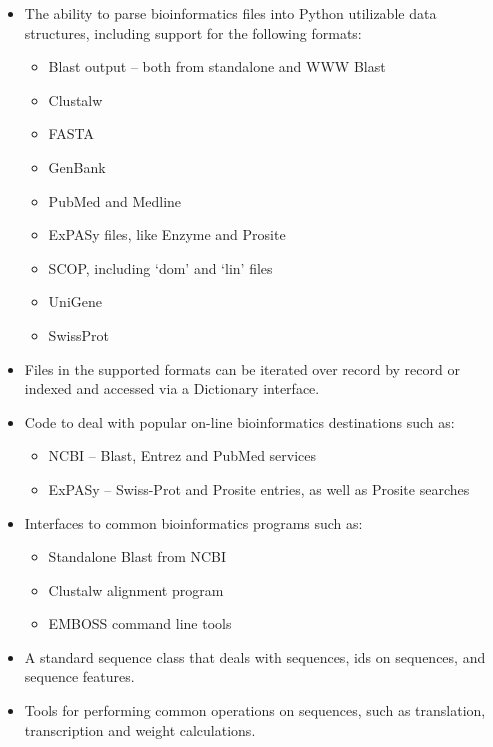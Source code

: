 \begin{itemize}
  \item The ability to parse bioinformatics files into Python utilizable data structures, including support for the following formats:

  \begin{itemize}
    \item Blast output -- both from standalone and WWW Blast
    \item Clustalw
    \item FASTA
    \item GenBank
    \item PubMed and Medline
    \item ExPASy files, like Enzyme and Prosite
    \item SCOP, including `dom' and `lin' files
    \item UniGene
    \item SwissProt
  \end{itemize}

  \item Files in the supported formats can be iterated over record by record or indexed and accessed via a Dictionary interface.

  \item Code to deal with popular on-line bioinformatics destinations such as:

  \begin{itemize}
    \item NCBI -- Blast, Entrez and PubMed services
    \item ExPASy -- Swiss-Prot and Prosite entries, as well as Prosite searches
  \end{itemize}

  \item Interfaces to common bioinformatics programs such as:

  \begin{itemize}
    \item Standalone Blast from NCBI
    \item Clustalw alignment program
    \item EMBOSS command line tools
  \end{itemize}

  \item A standard sequence class that deals with sequences, ids on sequences, and sequence features.

  \item Tools for performing common operations on sequences, such as translation, transcription and weight calculations.


\end{itemize}
